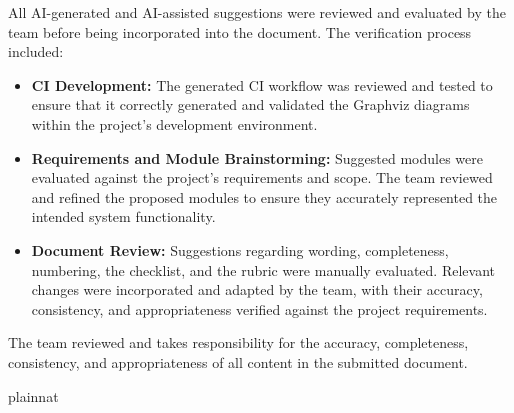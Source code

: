 \documentclass[12pt, titlepage]{article}
\begin{document}
All AI-generated and AI-assisted suggestions were reviewed and evaluated by the team before being incorporated into the document.
The verification process included:
\begin{itemize}
    \item \textbf{CI Development:} The generated CI workflow was reviewed and tested to ensure that it
    correctly generated and validated the Graphviz diagrams within the project's development environment.

    \item \textbf{Requirements and Module Brainstorming:} Suggested modules were evaluated against the
    project's requirements and scope. The team reviewed and refined the proposed modules to ensure they
    accurately represented the intended system functionality.

    \item \textbf{Document Review:} Suggestions regarding wording, completeness, numbering, the checklist,
    and the rubric were manually evaluated. Relevant changes were incorporated and adapted by the team,
    with their accuracy, consistency, and appropriateness verified against the project requirements.
\end{itemize}

The team reviewed and takes responsibility for the accuracy, completeness, consistency, and appropriateness
of all content in the submitted document.

\newpage{}

 {plainnat}

\end{document}
